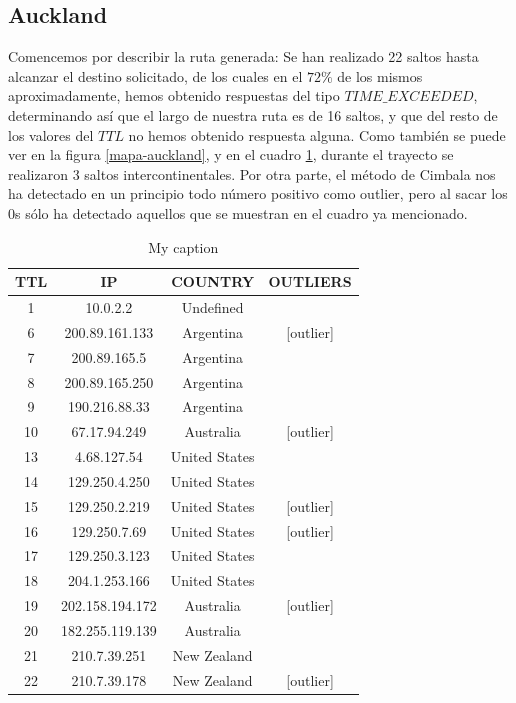 \subsection{Auckland}

Comencemos por describir la ruta generada:
Se han realizado 22 saltos hasta alcanzar el destino solicitado, de los cuales en el $72 \% $ de los mismos aproximadamente, hemos obtenido respuestas del tipo $TIME\_EXCEEDED$, determinando así que el largo de nuestra ruta es de 16 saltos, y que del resto de los valores del $TTL$ no hemos obtenido respuesta alguna. Como también se puede ver en la figura \ref{mapa-auckland}, y en el cuadro \ref{tabla-auckland}, durante el trayecto se realizaron 3 saltos intercontinentales. Por otra parte, el método de Cimbala nos ha detectado en un principio todo número positivo como outlier, pero al sacar los 0s sólo ha detectado aquellos que se muestran en el cuadro ya mencionado.

\begin{table}[!htbp]
\centering
\caption{My caption}
\label{tabla-auckland}
\begin{tabular}{|c|c|c|c|}
\hline
\textbf{TTL} & \textbf{IP}    & \textbf{COUNTRY} & \textbf{OUTLIERS} \\ \hline
1   & 10.0.2.2        & Undefined     &               \\ \hline
6   & 200.89.161.133  & Argentina     & {[}outlier{]} \\ \hline
7   & 200.89.165.5    & Argentina     &               \\ \hline
8   & 200.89.165.250  & Argentina     &               \\ \hline
9   & 190.216.88.33   & Argentina     &               \\ \hline
10  & 67.17.94.249    & Australia     & {[}outlier{]} \\ \hline
13  & 4.68.127.54     & United States &               \\ \hline
14  & 129.250.4.250   & United States &               \\ \hline
15  & 129.250.2.219   & United States & {[}outlier{]} \\ \hline
16  & 129.250.7.69    & United States & {[}outlier{]} \\ \hline
17  & 129.250.3.123   & United States &               \\ \hline
18  & 204.1.253.166   & United States &               \\ \hline
19  & 202.158.194.172 & Australia     & {[}outlier{]} \\ \hline
20  & 182.255.119.139 & Australia     &               \\ \hline
21  & 210.7.39.251    & New Zealand   &               \\ \hline
22  & 210.7.39.178    & New Zealand   & {[}outlier{]} \\ \hline
\end{tabular}
\end{table}

